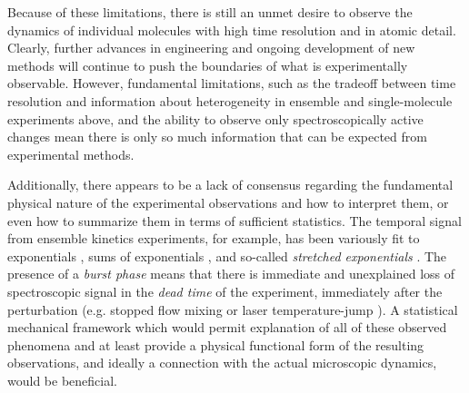 Because of these limitations, there is still an unmet desire to observe the dynamics of individual molecules with high time resolution and in atomic detail.
Clearly, further advances in engineering and ongoing development of new methods will continue to push the boundaries of what is experimentally observable.
However, fundamental limitations, such as the tradeoff between time resolution and information about heterogeneity in ensemble and single-molecule experiments above, and the ability to observe only spectroscopically active changes mean there is only so much information that can be expected from experimental methods.

Additionally, there appears to be a lack of consensus regarding the fundamental physical nature of the experimental observations and how to interpret them, or even how to summarize them in terms of sufficient statistics.
The temporal signal from ensemble kinetics experiments, for example, has been variously fit to exponentials \cite{eaton:jpcb:2000}, sums of exponentials \cite{eaton:biochem:1997,munoz:1997a,steinbach:biophys-j:2002,yang:2004c}, and so-called \emph{stretched exponentials} \cite{gruebele:pnas:2005}.
The presence of a \emph{burst phase} means that there is immediate and unexplained loss of spectroscopic signal in the \emph{dead time} of the experiment, immediately after the perturbation (e.g. stopped flow mixing or laser temperature-jump \cite{gruebele:1998a}).
A statistical mechanical framework which would permit explanation of all of these observed phenomena and at least provide a physical functional form of the resulting observations, and ideally a connection with the actual microscopic dynamics, would be beneficial.

